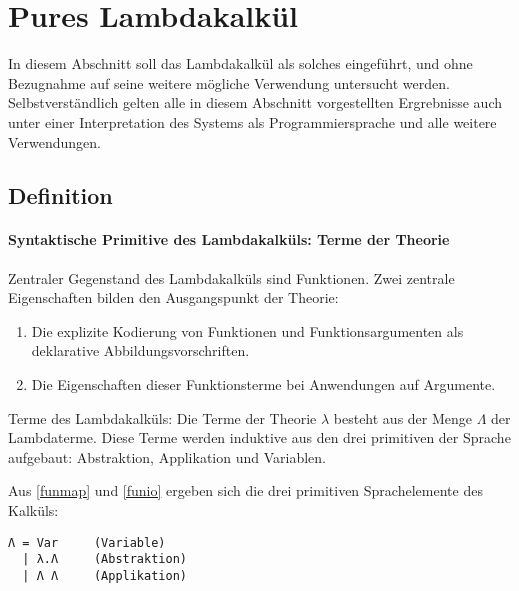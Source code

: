 
\newpage
\section{Pures Lambdakalkül}

In diesem Abschnitt soll das Lambdakalkül als solches eingeführt,
und ohne Bezugnahme auf seine weitere mögliche Verwendung untersucht
werden. Selbstverständlich gelten alle in diesem Abschnitt vorgestellten
Ergrebnisse auch unter einer Interpretation des Systems als Programmiersprache
und alle weitere Verwendungen.


\subsection{Definition}

\begin{comment}
weitere untergliederung:
Definition
Conversion
Reduction
Theorien
Modelle
\end{comment}

\paragraph{Syntaktische Primitive des Lambdakalküls: Terme der Theorie}

Zentraler Gegenstand des Lambdakalküls sind Funktionen.
Zwei zentrale Eigenschaften bilden den Ausgangspunkt der Theorie:
\begin{enumerate}
\item \label{funmap} Die explizite Kodierung von Funktionen und 
	Funktionsargumenten als deklarative Abbildungsvorschriften.
\item \label{funio} 
	Die Eigenschaften dieser Funktionsterme bei Anwendungen auf Argumente.
\end{enumerate}

Terme des Lambdakalküls: %
Die Terme der Theorie $λ$ besteht aus der Menge $Λ$ der Lambdaterme.
Diese Terme werden induktive aus den drei primitiven der Sprache aufgebaut:
Abstraktion, Applikation und Variablen.

\begin{definition}
Aus \ref{funmap} und \ref{funio} ergeben sich die 
drei primitiven Sprachelemente des Kalküls:
\begin{verbatim}
Λ = Var		(Variable)
  | λ.Λ		(Abstraktion)
  | Λ Λ		(Applikation)
\end{verbatim}
\end{definition}

